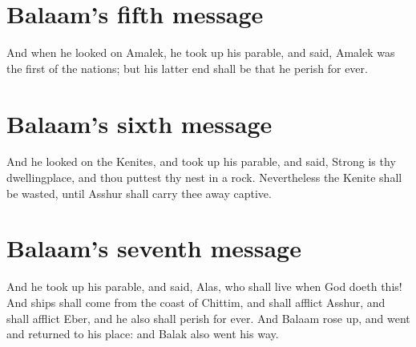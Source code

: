 \begin{biblechapter}
\section*{Balaam's fifth message}
\verse And when he looked on Amalek, he took up his parable, and said, Amalek was the first of the nations; but his latter end shall be that he perish for ever.
\section*{Balaam's sixth message}
\verse And he looked on the Kenites, and took up his parable, and said, Strong is thy dwellingplace, and thou puttest thy nest in a rock.
\verse Nevertheless the Kenite shall be wasted, until Asshur shall carry thee away captive.
\section*{Balaam's seventh message}
\verse And he took up his parable, and said, Alas, who shall live when God doeth this!
\verse And ships shall come from the coast of Chittim, and shall afflict Asshur, and shall afflict Eber, and he also shall perish for ever.
\verse And Balaam rose up, and went and returned to his place: and Balak also went his way.
\end{biblechapter}

